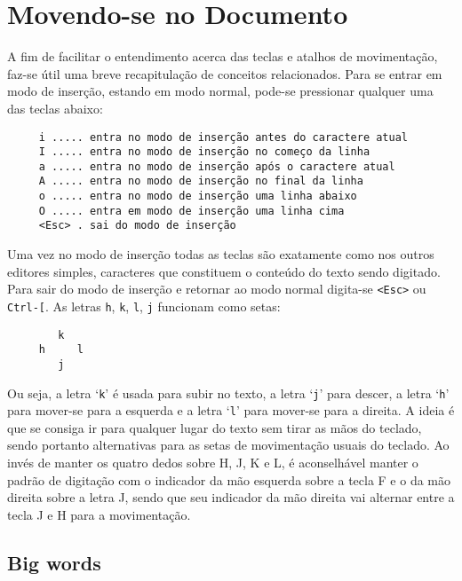 
\chapter{Movendo-se no Documento}
\label{cha:Movendo-se no Documento}

A fim de facilitar o entendimento acerca das teclas e atalhos de movimentação,
faz-se útil uma breve recapitulação de conceitos relacionados. Para se entrar
em modo de inserção, estando em modo normal, pode-se pressionar qualquer uma
das teclas abaixo:

\begin{verbatim}
     i ..... entra no modo de inserção antes do caractere atual
     I ..... entra no modo de inserção no começo da linha
     a ..... entra no modo de inserção após o caractere atual
     A ..... entra no modo de inserção no final da linha
     o ..... entra no modo de inserção uma linha abaixo
     O ..... entra em modo de inserção uma linha cima
     <Esc> . sai do modo de inserção
\end{verbatim}

Uma vez no modo de inserção todas as teclas são exatamente como nos outros
editores simples, caracteres que constituem o conteúdo do texto sendo digitado.
Para sair do modo de inserção e retornar ao modo normal digita-se \verb+<Esc>+
ou \verb+Ctrl-[+. As letras {\tt h}, {\tt k}, {\tt l}, {\tt j} funcionam como
setas:

\begin{verbatim}
        k
     h     l
        j
\end{verbatim}

Ou seja, a letra `{\tt k}' é usada para subir no texto, a letra `{\tt j}' para descer,
a letra `{\tt h}' para mover-se para a esquerda e a letra `{\tt l}' para mover-se para
a direita. A ideia é que se consiga ir para qualquer lugar do texto sem tirar
as mãos do teclado, sendo portanto alternativas para as setas de movimentação
usuais do teclado. Ao invés de manter os quatro dedos sobre H, J, K e L, é aconselhável 
manter o padrão de digitação com o indicador da mão esquerda sobre a tecla F e o da mão
direita sobre a letra J, sendo que seu indicador da mão direita vai alternar entre a
tecla J e H para a movimentação.

\section{Big words}
\label{Big words}

